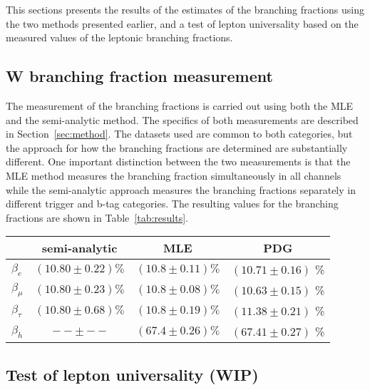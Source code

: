 
This sections presents the results of the estimates of the branching
fractions using the two methods presented earlier, and a test of lepton
universality based on the measured values of the leptonic branching
fractions.

\subsection{W branching fraction measurement}

The measurement of the branching fractions is carried out using both the
MLE and the semi-analytic method.  The specifics of both measurements
are described in Section~\ref{sec:method}.  The datasets used are common
to both categories, but the approach for how the branching fractions are
determined are substantially different.  One important distinction
between the two measurements is that the MLE method measures the
branching fraction simultaneously in all channels while the
semi-analytic approach measures the branching fractions separately in
different trigger and b-tag categories.  The resulting values for the
\PW branching fractions are shown in
Table~\ref{tab:results}.

\begin{table}[h]
    \centering
    \begin{tabular}{l|c|c|c}
                   & semi-analytic          & MLE                   & PDG                   \\
    \hline                                                                 
    $\beta_{e}$    & $ (10.80 \pm 0.22) \%$ & $(10.8 \pm 0.11) \%$ & $(10.71 \pm 0.16)$ \% \\
    $\beta_{\mu}$  & $ (10.80 \pm 0.23) \%$ & $(10.8 \pm 0.08) \%$ & $(10.63 \pm 0.15)$ \% \\
    $\beta_{\tau}$ & $ (10.80 \pm 0.68) \%$ & $(10.8 \pm 0.19) \%$ & $(11.38 \pm 0.21)$ \% \\
    $\beta_{h}$    & $-- \pm --$            & $(67.4 \pm 0.26) \%$ & $(67.41 \pm 0.27)$ \% \\
    \end{tabular}
\end{table}




\FloatBarrier
\subsection{Test of lepton universality (\textbf{WIP})}

